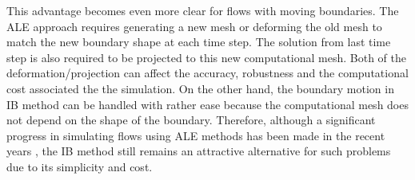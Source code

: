 This advantage becomes even more clear for flows with moving boundaries. The ALE approach requires generating a new mesh or deforming the old mesh to match the new boundary shape at each time step. The solution from last time step is also required to be projected to this new computational mesh. Both of the deformation/projection can affect the accuracy, robustness and the computational cost associated the the simulation. On the other hand, the boundary motion in IB method can be handled with rather ease because the computational mesh does not depend on the shape of the boundary. Therefore, although a significant progress in simulating flows using ALE methods has been made in the recent years \cite{lomtev1999discontinuous, farhat2004cfd, cheng2005fluid}, the IB method still remains an attractive alternative for such problems due to its simplicity and cost.
